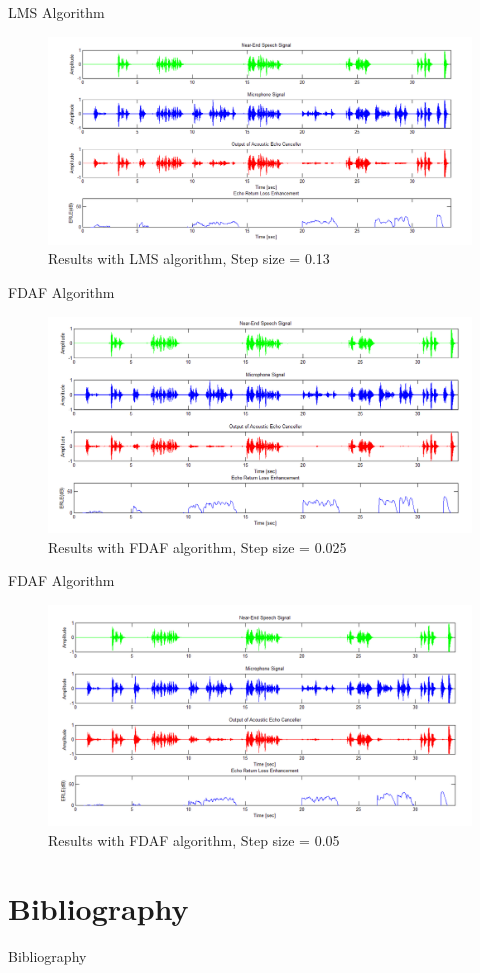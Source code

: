 \documentclass[xcolor=dvipsnames]{beamer}
\begin{document}
\begin{frame}{LMS Algorithm}
	\begin{figure}
		\includegraphics[width=\textwidth]{LMS_Result_13e-2}
		\caption{Results with LMS algorithm, Step size = 0.13}
	\end{figure}
\end{frame}


\begin{frame}{FDAF Algorithm}
	\begin{figure}
		\includegraphics[width=\textwidth]{FDAF_Result}
		\caption{Results with FDAF algorithm, Step size = 0.025}
	\end{figure}
\end{frame}

\begin{frame}{FDAF Algorithm}
	\begin{figure}
		\includegraphics[width=\textwidth]{FDAF_Result_5e-2}
		\caption{Results with FDAF algorithm, Step size = 0.05}
	\end{figure}
\end{frame}

\nocite{*}
\section{Bibliography}
\begin{frame}{Bibliography}
	
	
\end{frame}
\end{document}

